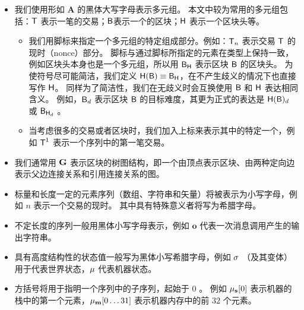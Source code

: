 \begin{itemize}[nosep]
	
	
	\item 我们使用形如  $\mathbf{A}$ 的黑体大写字母表示多元组。
	本文中较为常用的多元组包括：$\textsf{T}$ 表示一笔{\name}的交易；$\textsf{B}$表示一个{\name}的区块；$\textsf{H}$ 表示一个区块头等。
	\begin{itemize}[nosep]
		\item 我们用脚标来指定一个多元组的特定组成部分。例如：$\textsf{T}_n$ 表示交易 $\textsf{T}$ 的现时（nonce）部分。
		脚标与通过脚标所指定的元素在类型上保持一致，例如区块头本身也是一个多元组，所以用 $\textsf{B}_{\textsf{H}}$ 表示区块 $\textsf{B}$ 的区块头。
		为使符号尽可能简洁，我们定义 $\textsf{H}(\textsf{B})\equiv \textsf{B}_{\textsf{H}}$，在不产生歧义的情况下也直接写作 $\textsf{H}$。
		同样为了简洁性，我们在无歧义时会互换使用 $\textsf{B}$ 和 $\textsf{H}$ 表达相同含义。
		例如，$\textsf{B}_d$ 表示区块 $\textsf{B}$ 的目标难度，其更为正式的表达是 $\textsf{H}(\textsf{B})_d$ 或 $\textsf{B}_{\textsf{H}_d}$ 。
		
		
		\item 当考虑很多的交易或者区块时，我们加入上标来表示其中的特定一个，例如 $\textsf{T}^1$ 表示一个序列中的第一笔交易。
	\end{itemize}
	
	
	\item 我们通常用 $\textbf{G}$ 表示区块的树图结构，即一个由顶点表示区块、由两种定向边表示父边连接关系和引用连接关系的图。
	
	
	\item 标量和长度一定的元素序列（数组、字符串和矢量）将被表示为小写字母，例如 $n$ 表示一个交易的现时。
	其中具有特殊意义者将写为希腊字母。
	
	
	\item 不定长度的序列一般用黑体小写字母表示，例如 $\mathbf{o}$ 代表一次消息调用产生的输出字符串。
	
	
	\item 具有高度结构性的状态值一般写为黑体小写希腊字母，例如 $\mathbf{\sigma}$ （及其变体）用于代表世界状态，$\mathbf{\mu}$ 代表机器状态。
	
	
	\item 方括号将用于指明一个序列中的子序列，起始于 $0$ 。
	例如 $\mathbf{\mu}_{\mathbf{s}}[0]$ 表示机器的栈中的第一个元素，$\mathbf{\mu}_{\mathbf{m}}[0\dots 31]$ 表示机器内存中的前 $32$ 个元素。
	

\end{itemize}
